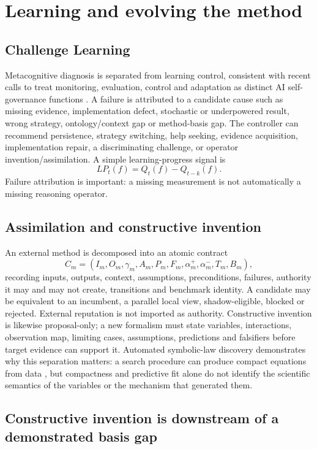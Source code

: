 \section{Learning and evolving the method}
\subsection{Challenge Learning}
Metacognitive diagnosis is separated from learning control, consistent with recent calls to treat monitoring, evaluation, control and adaptation as distinct AI self-governance functions \cite{ji2026}. A failure is attributed to a candidate cause such as missing evidence, implementation defect, stochastic or underpowered result, wrong strategy, ontology/context gap or method-basis gap. The controller can recommend persistence, strategy switching, help seeking, evidence acquisition, implementation repair, a discriminating challenge, or operator invention/assimilation. A simple learning-progress signal is
\begin{equation}LP_t(f)=Q_t(f)-Q_{t-k}(f).\end{equation}
Failure attribution is important: a missing measurement is not automatically a missing reasoning operator.

\subsection{Assimilation and constructive invention}
An external method is decomposed into an atomic contract
\begin{equation}C_m=(I_m,O_m,\gamma_m,A_m,P_m,F_m,\alpha_m^+,\alpha_m^-,T_m,B_m),\end{equation}
recording inputs, outputs, context, assumptions, preconditions, failures, authority it may and may not create, transitions and benchmark identity. A candidate may be equivalent to an incumbent, a parallel local view, shadow-eligible, blocked or rejected. External reputation is not imported as authority. Constructive invention is likewise proposal-only; a new formalism must state variables, interactions, observation map, limiting cases, assumptions, predictions and falsifiers before target evidence can support it. Automated symbolic-law discovery demonstrates why this separation matters: a search procedure can produce compact equations from data \cite{schmidt2009}, but compactness and predictive fit alone do not identify the scientific semantics of the variables or the mechanism that generated them.

\subsection{Constructive invention is downstream of a demonstrated basis gap}

